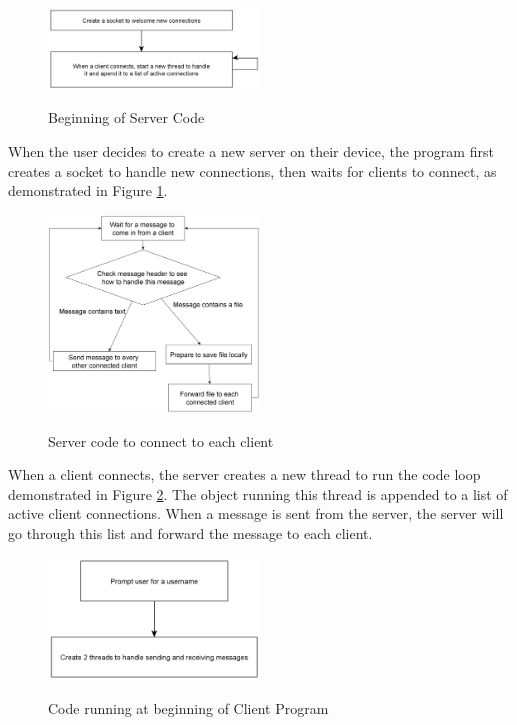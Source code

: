 \documentclass{article}
\begin{document}
\begin{figure}[h]
\caption{Beginning of Server Code}
\centering
\includegraphics[width=0.5\textwidth]{media/serverFlowchart2.png}
\label{server2}
\end{figure}

When the user decides to create a new server on their device, the program first creates a socket to handle new connections, then waits for clients to connect, as demonstrated in Figure \ref{server2}.

\begin{figure}[h]
\caption{Server code to connect to each client}
\centering
\includegraphics[width=0.5\textwidth]{media/serverFlowchart1.png}
\label{server1}
\end{figure}

When a client connects, the server creates a new thread to run the code loop demonstrated in Figure \ref{server1}. The object running this thread is appended to a list of active client connections. When a message is sent from the server, the server will go through this list and forward the message to each client.

\begin{figure}[h]
\caption{Code running at beginning of Client Program}
\centering
\includegraphics[width=0.5\textwidth]{media/clientFlowchart2.png}
\label{client2}
\end{figure}
\end{document}
